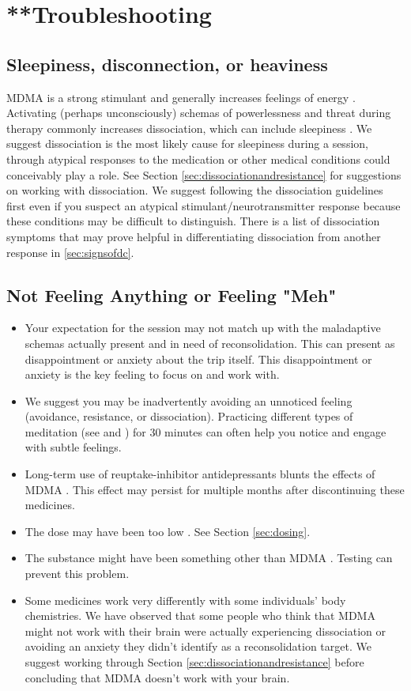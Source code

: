 \documentclass[12pt,letterpaper]{book}
\begin{document}
\section{**Troubleshooting}
\label{sec:troubleshooting}
\subsection*{Sleepiness, disconnection, or heaviness}
MDMA is a strong stimulant and generally increases feelings of energy \cite{vizeliActuteEffects}. Activating (perhaps unconsciously) schemas of powerlessness and threat during therapy commonly increases dissociation, which can include sleepiness \cite{kozlowskaDefenseCascade}. We suggest dissociation is the most likely cause for sleepiness during a session, through atypical responses to the medication or other medical conditions could conceivably play a role. See Section \ref{sec:dissociationandresistance} for suggestions on working with dissociation. We suggest following the dissociation guidelines first even if you suspect an atypical stimulant/neurotransmitter response because these conditions may be difficult to distinguish. There is a list of dissociation symptoms that may prove helpful in differentiating dissociation from another response in \ref{sec:signsofdc}.
\subsection*{Not Feeling Anything or Feeling "Meh"}
\begin{itemize}
    \item Your expectation for the session may not match up with the maladaptive schemas actually present and in need of reconsolidation. This can present as disappointment or anxiety about the trip itself. This disappointment or anxiety is the key feeling to focus on and work with.
    \item We suggest you may be inadvertently avoiding an unnoticed feeling (avoidance, resistance, or dissociation). Practicing different types of meditation (see \textcite{rain} and \textcite{bodyscan}) for 30 minutes can often help you notice and engage with subtle feelings.
    \item Long-term use of reuptake-inhibitor antidepressants blunts the effects of MDMA \cite{feducciaSSRIDiscontinuation}. This effect may persist for multiple months after discontinuing these medicines.
    \item The dose may have been too low \cite{bediMDMALowDose}. See Section \ref{sec:dosing}.
    \item The substance might have been something other than MDMA \cite{saleemiAdulterants}. Testing can prevent this problem.
    \item Some medicines work very differently with some individuals' body chemistries. We have observed that some people who think that MDMA might not work with their brain were actually experiencing dissociation or avoiding an anxiety they didn't identify as a reconsolidation target. We suggest working through Section \ref{sec:dissociationandresistance} before concluding that MDMA doesn't work with your brain. 
\end{itemize}
\end{document}
